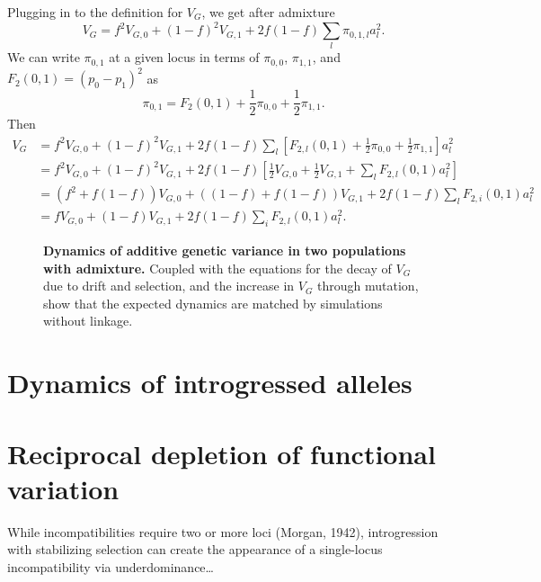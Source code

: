 \documentclass{article}
\begin{document}
Plugging in to the definition for $V_G$, we get after admixture
\[V_G = f^2 V_{G,0} + (1-f)^2 V_{G,1} + 2f(1-f)\sum_l \pi_{0,1,l}a_l^2.\]
We can write $\pi_{0,1}$ at a given locus in terms of $\pi_{0,0}$, $\pi_{1,1}$,
and $F_2(0,1)=(p_0-p_1)^2$ as \citep{peter2016admixture}
\[\pi_{0,1} = F_2(0,1) + \frac{1}{2}\pi_{0,0} + \frac{1}{2}\pi_{1,1}.\]
Then
\begin{align*}
    V_G & = f^2 V_{G,0} + (1-f)^2 V_{G,1} + 2f(1-f)\sum_l \left[F_{2,l}(0,1)
    + \frac{1}{2}\pi_{0,0} + \frac{1}{2}\pi_{1,1}\right] a_l^2 \\
    & = f^2 V_{G,0} + (1-f)^2 V_{G,1} + 2f(1-f)\left[\frac{1}{2}V_{G,0} 
    + \frac{1}{2}V_{G,1} + \sum_l F_{2,l}(0,1)a_l^2\right] \\
    & = \left(f^2 + f(1-f)\right) V_{G,0} + \left((1-f) + f(1-f)\right)V_{G,1}
    + 2f(1-f) \sum_l F_{2,i}(0,1)a_l^2 \\
    & = f V_{G,0} + (1-f)V_{G,1} + 2f(1-f)\sum_i F_{2,l}(0,1)a_l^2.
\end{align*}


\begin{figure}[tb!]
    \centering
    \caption{
        \textbf{Dynamics of additive genetic variance in two populations with admixture.}
        Coupled with the equations for the decay of $V_G$ due to drift and selection,
        and the increase in $V_G$ through mutation, show that the expected dynamics
        are matched by simulations without linkage.
    }
    \label{fig:VG_dynamics}
\end{figure}

\section{Dynamics of introgressed alleles}

\section{Reciprocal depletion of functional variation}

While incompatibilities require two or more loci (Morgan, 1942), introgression
with stabilizing selection can create the appearance of a single-locus
incompatibility via underdominance\dots
\end{document}

